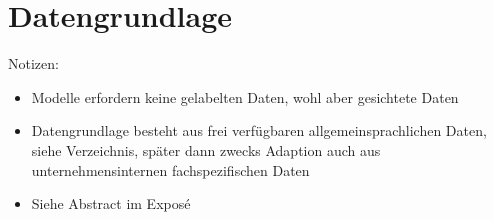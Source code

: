 \chapter{Datengrundlage}
\thispagestyle{fancy}
\label{chap:Datengrundlage}

Notizen:
\begin{itemize}
	\item Modelle erfordern keine gelabelten Daten, wohl aber gesichtete Daten
	\item Datengrundlage besteht aus frei verfügbaren allgemeinsprachlichen Daten, siehe Verzeichnis, später dann zwecks Adaption auch aus unternehmensinternen fachspezifischen Daten
	\item Siehe Abstract im Exposé
\end{itemize}
